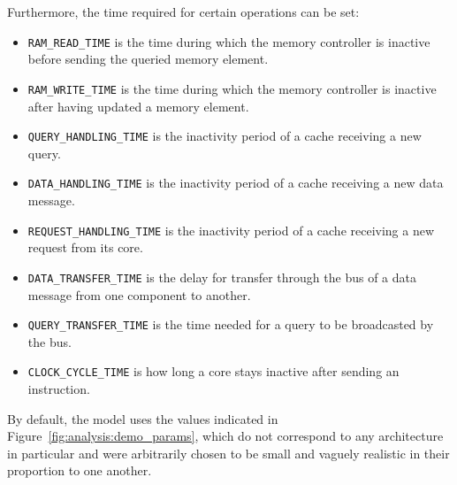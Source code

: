 Furthermore, the time required for certain operations can be set:
\begin{itemize}
\item
   \lstinline!RAM_READ_TIME! is the time during which the memory controller
   is inactive before sending the queried memory element.
\item
   \lstinline!RAM_WRITE_TIME! is the time during which the memory controller
   is inactive after having updated a memory element.
\item
   \lstinline!QUERY_HANDLING_TIME! is the inactivity period of a cache receiving
   a new query.
\item
   \lstinline!DATA_HANDLING_TIME! is the inactivity period of a cache receiving
   a new data message.
\item
   \lstinline!REQUEST_HANDLING_TIME! is the inactivity period of a cache
   receiving a new request from its core.
\item
   \lstinline!DATA_TRANSFER_TIME! is the delay for transfer through the bus
   of a data message from one component to another.
\item
   \lstinline!QUERY_TRANSFER_TIME! is the time needed for a query to be
   broadcasted by the bus.
\item
   \lstinline!CLOCK_CYCLE_TIME! is how long a core stays inactive after sending
   an instruction.
\end{itemize}

By default, the model uses the values indicated in
Figure~\ref{fig:analysis:demo_params}, which do not correspond to any
architecture in particular and were arbitrarily chosen to be small and vaguely
realistic in their proportion to one another.

